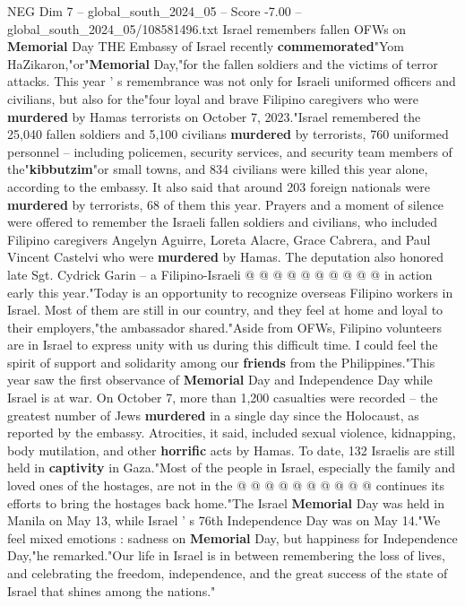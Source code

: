\begin{textsample}{NEG Dim 7 – global\_south\_2024\_05 – Score -7.00 – global\_south\_2024\_05/108581496.txt}  \label{ex:f7_neg_382}
Israel remembers fallen OFWs on \textbf{Memorial} Day THE Embassy of Israel recently \textbf{commemorated}"Yom HaZikaron,"or"\textbf{Memorial} Day,"for the fallen soldiers and the victims of terror attacks.
This year ' s remembrance was not only for Israeli uniformed officers and civilians, but also for the"four loyal and brave Filipino caregivers who were \textbf{murdered} by Hamas terrorists on October 7, 2023."Israel remembered the 25,040 fallen soldiers and 5,100 civilians \textbf{murdered} by terrorists, 760 uniformed personnel -- including policemen, security services, and security team members of the"\textbf{kibbutzim}"or small towns, and 834 civilians were killed this year alone, according to the embassy.
It also said that around 203 foreign nationals were \textbf{murdered} by terrorists, 68 of them this year.
Prayers and a moment of silence were offered to remember the Israeli fallen soldiers and civilians, who included Filipino caregivers Angelyn Aguirre, Loreta Alacre, Grace Cabrera, and Paul Vincent Castelvi who were \textbf{murdered} by Hamas.
The deputation also honored late Sgt.
Cydrick Garin -- a Filipino-Israeli @ @ @ @ @ @ @ @ @ @ in action early this year."Today is an opportunity to recognize overseas Filipino workers in Israel.
Most of them are still in our country, and they feel at home and loyal to their employers,"the ambassador shared."Aside from OFWs, Filipino volunteers are in Israel to express unity with us during this difficult time.
I could feel the spirit of support and solidarity among our \textbf{friends} from the Philippines."This year saw the first observance of \textbf{Memorial} Day and Independence Day while Israel is at war.
On October 7, more than 1,200 casualties were recorded -- the greatest number of Jews \textbf{murdered} in a single day since the Holocaust, as reported by the embassy.
Atrocities, it said, included sexual violence, kidnapping, body mutilation, and other \textbf{horrific} acts by Hamas.
To date, 132 Israelis are still held in \textbf{captivity} in Gaza."Most of the people in Israel, especially the family and loved ones of the hostages, are not in the @ @ @ @ @ @ @ @ @ @ continues its efforts to bring the hostages back home."The Israel \textbf{Memorial} Day was held in Manila on May 13, while Israel ' s 76th Independence Day was on May 14."We feel mixed emotions : sadness on \textbf{Memorial} Day, but happiness for Independence Day,"he remarked."Our life in Israel is in between remembering the loss of lives, and celebrating the freedom, independence, and the great success of the state of Israel that shines among the nations."

\end{textsample}
